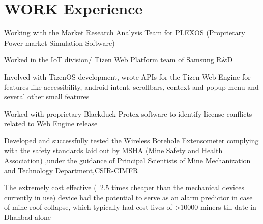 \documentclass[]{Ayushi-resume}
\begin{document}
\begin{minipage}[t]{0.66\textwidth} 


\section{WORK Experience}
\vspace{\topsep}
\vspace{\topsep}
\begin{tightemize}
\justifying
\item Working with the Market Research Analysis Team for PLEXOS (Proprietary Power market Simulation Software)
\end{tightemize}
\sectionsep

\vspace{\topsep}
\begin{tightemize}
\justifying
\item Worked in the IoT division/ Tizen Web Platform team of Samsung R\&D
\item Involved with TizenOS development, wrote APIs for the Tizen Web Engine for features like accessibility, android intent, scrollbars, context and popup menu and several other small features
\item Worked with proprietary Blackduck Protex software to identify license conflicts related to Web Engine release
\end{tightemize}
\sectionsep

\begin{tightemize}
\justifying
\item Developed and successfully tested the Wireless Borehole Extensometer complying with the safety standards laid out by MSHA (Mine Safety and Health Association) ,under the guidance of Principal Scientists of Mine Mechanization and Technology Department,CSIR-CIMFR
\item The extremely cost effective (~2.5 times cheaper than the mechanical devices currently in use) device had the potential to serve as an alarm predictor in case of mine roof collapse, which typically had cost lives of >10000 miners till date in Dhanbad alone
\end{tightemize}
\sectionsep


\end{minipage}
\end{document}
